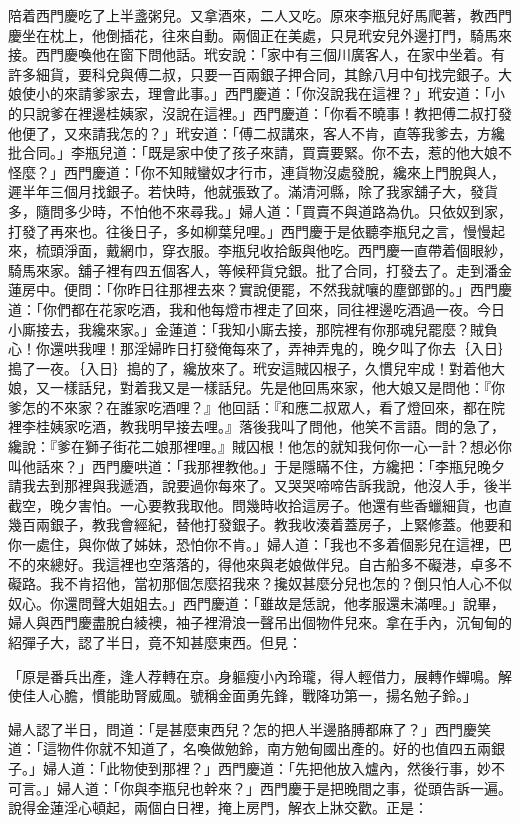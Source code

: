 \begin{showcontents}{}
陪着西門慶吃了上半盞粥兒。又拿酒來，二人又吃。原來李瓶兒好馬爬著，教西門慶坐在枕上，他倒插花，往來自動。兩個正在美處，只見玳安兒外邊打門，騎馬來接。西門慶喚他在窗下問他話。玳安說：「家中有三個川廣客人，在家中坐着。有許多細貨，要科兌與傅二叔，只要一百兩銀子押合同，其餘八月中旬找完銀子。大娘使小的來請爹家去，理會此事。」西門慶道：「你沒說我在這裡？」玳安道：「小的只說爹在裡邊桂姨家，沒說在這裡。」西門慶道：「你看不曉事！教把傅二叔打發他便了，又來請我怎的？」玳安道：「傅二叔講來，客人不肯，直等我爹去，方纔批合同。」李瓶兒道：「既是家中使了孩子來請，買賣要緊。你不去，惹的他大娘不怪麼？」西門慶道：「你不知賊蠻奴才行巿，連貨物沒處發脫，纔來上門脫與人，遲半年三個月找銀子。若快時，他就張致了。滿清河縣，除了我家舖子大，發貨多，隨問多少時，不怕他不來尋我。」婦人道：「買賣不與道路為仇。只依奴到家，打發了再來也。往後日子，多如柳葉兒哩。」西門慶于是依聽李瓶兒之言，慢慢起來，梳頭淨面，戴網巾，穿衣服。李瓶兒收拾飯與他吃。西門慶一直帶着個眼紗，騎馬來家。舖子裡有四五個客人，等候秤貨兌銀。批了合同，打發去了。走到潘金蓮房中。便問：「你昨日往那裡去來？實說便罷，不然我就嚷的塵鄧鄧的。」西門慶道：「你們都在花家吃酒，我和他每燈巿裡走了回來，同往裡邊吃酒過一夜。今日小廝接去，我纔來家。」金蓮道：「我知小廝去接，那院裡有你那魂兒罷麼？賊負心！你還哄我哩！那淫婦昨日打發俺每來了，弄神弄鬼的，晚夕叫了你去｛入日｝搗了一夜。｛入日｝搗的了，纔放來了。玳安這賊囚根子，久慣兒牢成！對着他大娘，又一樣話兒，對着我又是一樣話兒。先是他回馬來家，他大娘又是問他：『你爹怎的不來家？在誰家吃酒哩？』他回話：『和應二叔眾人，看了燈回來，都在院裡李桂姨家吃酒，教我明早接去哩。』落後我叫了問他，他笑不言語。問的急了，纔說：『爹在獅子街花二娘那裡哩。』賊囚根！他怎的就知我何你一心一計？想必你叫他話來？」西門慶哄道：「我那裡教他。」于是隱瞞不住，方纔把：「李瓶兒晚夕請我去到那裡與我遞酒，說要過你每來了。又哭哭啼啼告訴我說，他沒人手，後半截空，晚夕害怕。一心要教我取他。問幾時收拾這房子。他還有些香蠟細貨，也直幾百兩銀子，教我會經紀，替他打發銀子。教我收湊着蓋房子，上緊修蓋。他要和你一處住，與你做了姊妹，恐怕你不肯。」婦人道：「我也不多着個影兒在這裡，巴不的來總好。我這裡也空落落的，得他來與老娘做伴兒。自古船多不礙港，卓多不礙路。我不肯招他，當初那個怎麼招我來？攙奴甚麼分兒也怎的？倒只怕人心不似奴心。你還問聲大姐姐去。」西門慶道：「雖故是恁說，他孝服還未滿哩。」說畢，婦人與西門慶盡脫白綾襖，袖子裡滑浪一聲吊出個物件兒來。拿在手內，沉甸甸的紹彈子大，認了半日，竟不知甚麼東西。但見：

「原是番兵出產，逢人荐轉在京。身軀瘦小內玲瓏，得人輕借力，展轉作蟬鳴。解使佳人心膽，慣能助腎威風。號稱金面勇先鋒，戰降功第一，揚名勉子鈴。」

婦人認了半日，問道：「是甚麼東西兒？怎的把人半邊胳膊都麻了？」西門慶笑道：「這物件你就不知道了，名喚做勉鈴，南方勉甸國出產的。好的也值四五兩銀子。」婦人道：「此物使到那裡？」西門慶道：「先把他放入爐內，然後行事，妙不可言。」婦人道：「你與李瓶兒也幹來？」西門慶于是把晚間之事，從頭告訴一遍。說得金蓮淫心頓起，兩個白日裡，掩上房門，解衣上牀交歡。正是：


\end{showcontents}
